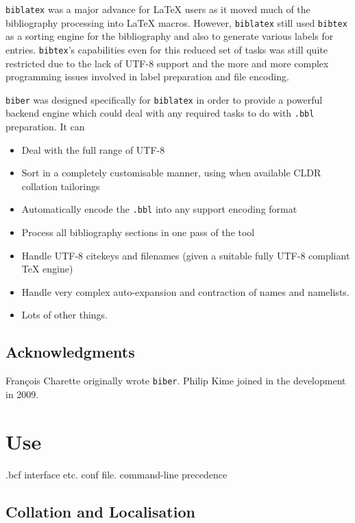 \documentclass{ltxdockit}
\begin{document}
\verb+biblatex+ was a major advance for LaTeX users as it moved much
of the bibliography processing into LaTeX macros. However,
\verb+biblatex+ still used \verb+bibtex+ as a sorting engine for the
bibliography and also to generate various labels for
entries. \verb+bibtex+'s capabilities even for this reduced set of
tasks was still quite restricted due to the lack of UTF-8 support and
the more and more complex programming issues involved in label
preparation and file encoding.

\verb+biber+ was designed specifically for \verb+biblatex+ in order to
provide a powerful backend engine which could deal with any required
tasks to do with \verb+.bbl+ preparation. It can

\begin{itemize}
\item Deal with the full range of UTF-8
\item Sort in a completely customisable manner, using when available
  CLDR collation tailorings
\item Automatically encode the \verb+.bbl+ into any support encoding
  format
\item Process all bibliography sections in one pass of the tool
\item Handle UTF-8 citekeys and filenames (given a suitable fully
  UTF-8 compliant TeX engine)
\item Handle very complex auto-expansion and contraction of names and
  namelists.
\item Lots of other things.
\end{itemize}

\subsection{Acknowledgments}

François Charette originally wrote \verb+biber+. Philip Kime joined in
the development in 2009.

\section{Use}\label{ref:use}
\label{use}

.bcf interface etc. conf file. command-line precedence

\subsection{Collation and Localisation}
\end{document}
